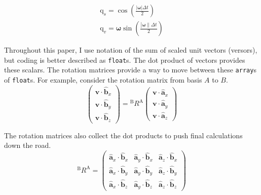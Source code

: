 \documentclass[lettersize,journal]{IEEEtran}
\begin{document}
\begin{eqnarray}
	\mathrm{q}_s = \cos\left(\frac{\left|\boldsymbol\omega\right|\Delta t}{2}\right)\nonumber\\
	\mathrm{q}_v = \boldsymbol\omega \sin\left(\frac{\left|\boldsymbol\omega\|\Delta t}{2}\right) \nonumber
\end{eqnarray}

Throughout this paper, I use notation of the sum of scaled unit vectors (versors), but coding is better described as \texttt{float}s. The dot product of vectors provides these scalars. The rotation matrices provide a way to move between these \texttt{array}s of \texttt{float}s. For example, consider the rotation matrix from basis $A$ to $B$.
\begin{equation}
  \begin{pmatrix}
    \mathbf{v} \cdot \mathbf{\hat{b}}_x \\
    \mathbf{v} \cdot \mathbf{\hat{b}}_y \\
    \mathbf{v} \cdot \mathbf{\hat{b}}_z
  \end{pmatrix}
  =
  {^\mathrm{B}R^\mathrm{A}}
  \begin{pmatrix}
    \mathbf{v} \cdot \mathbf{\hat{a}}_x \\
    \mathbf{v} \cdot \mathbf{\hat{a}}_y \\
    \mathbf{v} \cdot \mathbf{\hat{a}}_z
  \end{pmatrix}
\end{equation}

The rotation matrices also collect the dot products to push final calculations down the road.
\begin{equation}
  {^\mathrm{B}R^\mathrm{A}} = 
  \begin{pmatrix}
    \mathbf{\hat{a}}_x \cdot \mathbf{\hat{b}}_x &
    \mathbf{\hat{a}}_y \cdot \mathbf{\hat{b}}_x &
    \mathbf{\hat{a}}_z \cdot \mathbf{\hat{b}}_x \\
    \mathbf{\hat{a}}_x \cdot \mathbf{\hat{b}}_y &
    \mathbf{\hat{a}}_y \cdot \mathbf{\hat{b}}_y &
    \mathbf{\hat{a}}_z \cdot \mathbf{\hat{b}}_y \\
    \mathbf{\hat{a}}_x \cdot \mathbf{\hat{b}}_z &
    \mathbf{\hat{a}}_y \cdot \mathbf{\hat{b}}_z &
    \mathbf{\hat{a}}_z \cdot \mathbf{\hat{b}}_z
  \end{pmatrix}
\end{equation}
\end{document}
